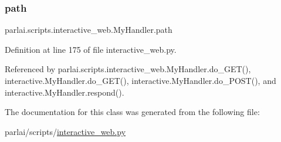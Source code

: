 \subsubsection{\texorpdfstring{path}{path}}
{\footnotesize\ttfamily parlai.\+scripts.\+interactive\+\_\+web.\+My\+Handler.\+path}



Definition at line 175 of file interactive\+\_\+web.\+py.



Referenced by parlai.\+scripts.\+interactive\+\_\+web.\+My\+Handler.\+do\+\_\+\+G\+E\+T(), interactive.\+My\+Handler.\+do\+\_\+\+G\+E\+T(), interactive.\+My\+Handler.\+do\+\_\+\+P\+O\+S\+T(), and interactive.\+My\+Handler.\+respond().



The documentation for this class was generated from the following file\+:\begin{DoxyCompactItemize}
\item 
parlai/scripts/\hyperlink{interactive__web_8py}{interactive\+\_\+web.\+py}\end{DoxyCompactItemize}
